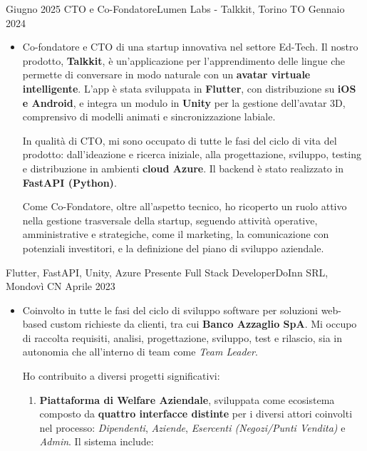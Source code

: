 \begin{experiences}

        \experience
{Giugno 2025}   {CTO e Co-Fondatore}{Lumen Labs - Talkkit, Torino TO}
{Gennaio 2024} {
	\begin{itemize}
	\item Co-fondatore e CTO di una startup innovativa nel settore Ed-Tech. Il nostro prodotto, \textbf{Talkkit}, è un'applicazione per l'apprendimento delle lingue che permette di conversare in modo naturale con un \textbf{avatar virtuale intelligente}. L'app è stata sviluppata in \textbf{Flutter}, con distribuzione su \textbf{iOS e Android}, e integra un modulo in \textbf{Unity} per la gestione dell’avatar 3D, comprensivo di modelli animati e sincronizzazione labiale.

	In qualità di CTO, mi sono occupato di tutte le fasi del ciclo di vita del prodotto: dall'ideazione e ricerca iniziale, alla progettazione, sviluppo, testing e distribuzione in ambienti \textbf{cloud Azure}. Il backend è stato realizzato in \textbf{FastAPI (Python)}.

	Come Co-Fondatore, oltre all’aspetto tecnico, ho ricoperto un ruolo attivo nella gestione trasversale della startup, seguendo attività operative, amministrative e strategiche, come il marketing, la comunicazione con potenziali investitori, e la definizione del piano di sviluppo aziendale.
\end{itemize}

}
{Flutter, FastAPI, Unity, Azure}
\emptySeparator
\emptySeparator
\experience
{Presente}   {Full Stack Developer}{DoInn SRL, Mondovì CN}
{Aprile 2023} {
	\begin{itemize}
		\item Coinvolto in tutte le fasi del ciclo di sviluppo software per soluzioni web-based custom richieste da clienti, tra cui \textbf{Banco Azzaglio SpA}. Mi occupo di raccolta requisiti, analisi, progettazione, sviluppo, test e rilascio, sia in autonomia che all'interno di team come \textit{Team Leader}.
		
		Ho contribuito a diversi progetti significativi:
		
		\begin{enumerate}
		\item \textbf{Piattaforma di Welfare Aziendale}, sviluppata come ecosistema composto da \textbf{quattro interfacce distinte} per i diversi attori coinvolti nel processo: \textit{Dipendenti}, \textit{Aziende}, \textit{Esercenti (Negozi/Punti Vendita)} e \textit{Admin}. Il sistema include:


\end{enumerate}
\end{itemize}}
\end{experiences}
